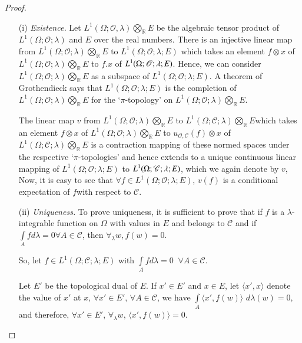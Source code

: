 \begin{proof}
\begin{itemize}
\item[{\rm (i)}] {\em Existence.} Let  $L^1(\Omega; \mathscr{O},
  \lambda) \bigotimes\limits_\mathbb{R} E$ be the algebraic tensor
  product of $L^1(\Omega; \mathscr{O}; \lambda)$ and $E$ over the real
  numbers. There is an injective linear map from $L^1(\Omega;
  \mathscr{O}; \lambda) \bigotimes\limits_\mathbb{R} E$ to
  $L^1(\Omega; \mathscr{O}; \lambda; E)$ which takes an element $f
  \otimes x$ of $L^1(\Omega; \mathscr{O}; \lambda)
  \bigotimes\limits_\mathbb{R} E$ to $f.x$ of $L^1(\Omega;\break
  \mathscr{O}; \lambda; E)$. Hence, we can consider $L^1 (\Omega;
  \mathscr{O}; \lambda) \bigotimes\limits_\mathbb{R} E$ as a subspace
  of $L^1 (\Omega; \mathscr{O}; \lambda; E)$. A theorem of Grothendieck says that $L^1 (\Omega; \mathscr{O}; \lambda; E)$ is the completion of $L^1 (\Omega; \mathscr{O}; \lambda) \bigotimes\limits_\mathbb{R}
  E$ for the `$\pi$-topology' on $L^1(\Omega; \mathscr{O}; \lambda)
  \bigotimes\limits_\mathbb{R} E$. 

The linear map $v$ from $L^1(\Omega;\mathscr{O};\lambda)
\bigotimes\limits_\mathbb{R} E$ to $L^1 (\Omega; \mathscr{C}; \lambda)
\bigotimes\limits_\mathbb{R} E$\break which takes an element $f \otimes x$
of $L^1 (\Omega; \mathscr{O};\lambda) \bigotimes\limits_\mathbb{R} E$
to $u_{\mathscr{O}, \mathscr{C}} (f) \otimes x$ of $L^1(\Omega;
\mathscr{C};\lambda) \bigotimes\limits_\mathbb{R} E$ is a contraction
mapping of these normed spaces under the respective `$\pi$-topologies'
and hence extends to a unique continuous linear mapping of
$L^1(\Omega; \mathscr{O}; \lambda; E)$ to $L^1 (\Omega; \mathscr{C};\break
\lambda; E)$, which we again denote by $v$, Now, it is easy to see
that $\forall f \in L^1 (\Omega; \mathscr{O}; \lambda; E)$, $v(f)$ is
a conditional expectation of $f$\pageoriginale with respect to
$\mathscr{C}$. 

\item[{\rm (ii)}] {\em Uniqueness. } To prove uniqueness, it is
  sufficient to prove that if $f$ is a $\lambda$-integrable function
  on $\Omega$ with values in $E$ and belongs to $\mathscr{C}$ and if
  $\int\limits_A f d \lambda = 0 \forall A \in \mathscr{C}$, then
  $\forall_\lambda w, f(w) = 0$. 

So, let $f \in L^1 (\Omega; \mathscr{C}; \lambda; E)$ with
$\int\limits_A f d \lambda = 0 \;\; \forall A \in \mathscr{C}$. 

Let $E'$ be the topological dual of $E$. If $x' \in E'$ and $x \in E$,
let $\langle x', x \rangle$ denote the value of $x'$ at $x$, $\forall
x' \in E'$, $\forall A \in \mathscr{C}$, we have $\int\limits_A
\langle x', f(w)\rangle$ $d\lambda(w) = 0$, and therefore, $\forall x'
\in E'$, $\forall_\lambda w$, $\langle x', f(w)\rangle =0$.
\end{itemize}
\end{proof}

